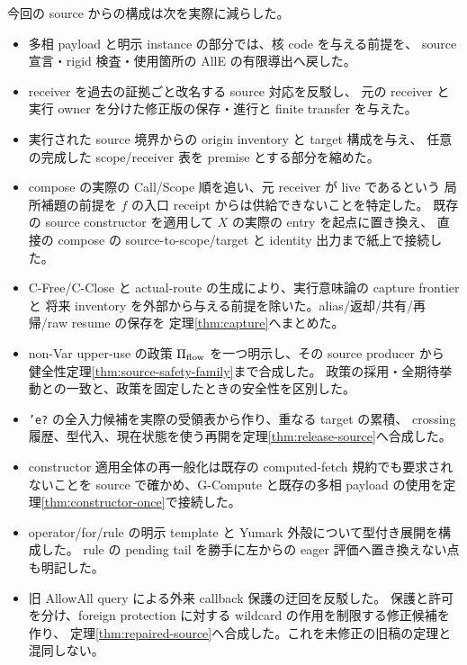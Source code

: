 \documentclass[11pt,a4paper]{article}
\begin{document}
今回の source からの構成は次を実際に減らした。
\begin{itemize}
\item 多相 payload と明示 instance の部分では、核 code を与える前提を、
source 宣言・rigid 検査・使用箇所の AllE の有限導出へ戻した。
\item receiver を過去の証拠ごと改名する source 対応を反駁し、
元の receiver と実行 owner を分けた修正版の保存・進行と finite transfer を与えた。
\item 実行された source 境界からの origin inventory と target 構成を与え、
任意の完成した scope/receiver 表を premise とする部分を縮めた。
\item compose の実際の Call/Scope 順を追い、元 receiver が live であるという
局所補題の前提を \(f\) の入口 receipt からは供給できないことを特定した。
既存の source constructor を適用して \(X\) の実際の entry を起点に置き換え、
直接の compose の source-to-scope/target と identity 出力まで紙上で接続した。
\item C-Free/C-Close と actual-route の生成により、実行意味論の capture frontier と
将来 inventory を外部から与える前提を除いた。alias/返却/共有/再帰/raw resume の保存を
定理\ref{thm:capture}へまとめた。
\item non-Var upper-use の政策 \(\Pi_{\rm flow}\) を一つ明示し、その source producer から
健全性定理\ref{thm:source-safety-family}まで合成した。
政策の採用・全期待挙動との一致と、政策を固定したときの安全性を区別した。
\item \texttt{'e?} の全入力候補を実際の受領表から作り、重なる target の累積、
crossing 履歴、型代入、現在状態を使う再開を定理\ref{thm:release-source}へ合成した。
\item constructor 適用全体の再一般化は既存の computed-fetch 規約でも要求されないことを
source で確かめ、G-Compute と既存の多相 payload の使用を定理\ref{thm:constructor-once}で接続した。
\item operator/for/rule の明示 template と Yumark 外殻について型付き展開を構成した。
rule の pending tail を勝手に左からの eager 評価へ置き換えない点も明記した。
\item 旧 AllowAll query による外来 callback 保護の迂回を反駁した。
保護と許可を分け、foreign protection に対する wildcard の作用を制限する修正候補を作り、
定理\ref{thm:repaired-source}へ合成した。これを未修正の旧稿の定理と混同しない。
\end{itemize}
\end{document}
